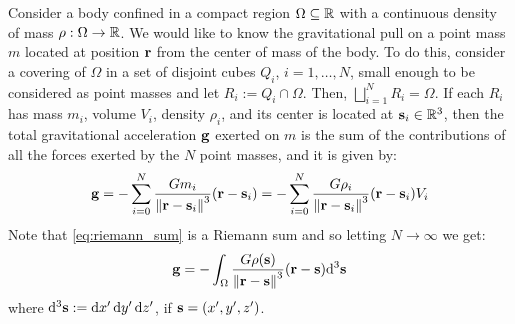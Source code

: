 \documentclass[../main.tex]{subfiles}
\begin{document}
Consider a body confined in a compact region $\Omega\subseteq\mathbb{R}$ with a continuous density of mass $\rho:\Omega\to\mathbb{R}$. We would like to know the gravitational pull on a point mass $m$ located at position $\boldsymbol{\mathrm{r}}$ from the center of mass of the body. To do this, consider a covering of $\Omega$ in a set of disjoint cubes $Q_i$, $i=1,\dots,N$, small enough to be considered as point masses and let $R_i:=Q_i\cap \Omega$. Then, $\bigsqcup_{i=1}^NR_i=\Omega$. If each $R_i$ has mass $m_i$, volume $V_i$, density $\rho_i$, and its center is located at $\boldsymbol{\mathrm{s}}_i\in\mathbb{R}^3$, then the total gravitational acceleration $\boldsymbol{\mathrm{g}}$ exerted on $m$ is the sum of the contributions of all the forces exerted by the $N$ point masses, and it is given by:
\begin{equation}\label{eq:riemann_sum}
  \boldsymbol{\mathrm{g}}=-\sum_{i=0}^{N}\frac{Gm_{i}}{\left\|\boldsymbol{\mathrm{r}}-\boldsymbol{\mathrm{s}}_{i}\right\|^3}(\boldsymbol{\mathrm{r}}-\boldsymbol{\mathrm{s}}_{i})=-\sum_{i=0}^{N}\frac{G\rho_{i}}{\left\|\boldsymbol{\mathrm{r}}-\boldsymbol{\mathrm{s}}_{i}\right\|^3}(\boldsymbol{\mathrm{r}}-\boldsymbol{\mathrm{s}}_{i})V_i
\end{equation}
Note that \cref{eq:riemann_sum} is a Riemann sum and so letting $N\to\infty$ we get:
\begin{equation}\label{eq:limit}
  \boldsymbol{\mathrm{g}}=-\int_{\Omega}\frac{G\rho(\boldsymbol{\mathrm{s}})}{\left\|\boldsymbol{\mathrm{r}}-\boldsymbol{\mathrm{s}}\right\|^3}(\boldsymbol{\mathrm{r}}-\boldsymbol{\mathrm{s}})\dd^3{\boldsymbol{\mathrm{s}}}
\end{equation}
where $\dd^3{\boldsymbol{\mathrm{s}}}:=\dd{x'}\dd{y'}\dd{z'}$, if $\boldsymbol{\mathrm{s}}=(x',y',z')$.
\end{document}
